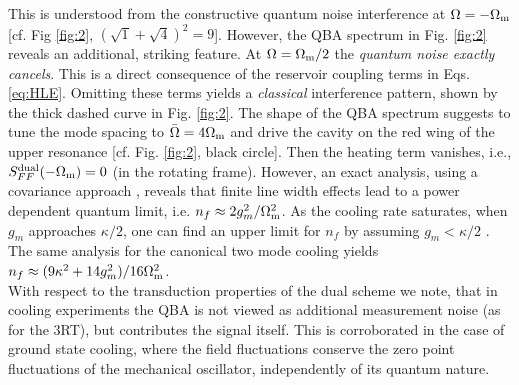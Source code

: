 \documentclass[twocolumn,english,aps,prl,superscriptaddress,showpacs,preprintnumbers]{revtex4}
\begin{document}
This is understood from the constructive quantum noise interference
at $\Omega=-\Omega_{\rm{m}}$ {[}cf. Fig \ref{fig:2}, $(\sqrt{1}+\sqrt{4})^{2}=9${]}.
However, the QBA spectrum in Fig. \ref{fig:2} reveals an additional,
striking feature. At $\Omega=\Omega_{\rm{m}}/2$ the \textit{quantum noise
exactly cancels}. This is a direct consequence of the reservoir coupling
terms in Eqs. \ref{eq:HLE}. Omitting these terms yields a \textit{classical}
interference pattern, shown by the thick dashed curve in Fig. \ref{fig:2}.
The shape of the QBA spectrum suggests to tune the mode spacing
to $\bar{\Omega}=4\Omega_{\rm{m}}$ and drive the cavity on the red wing
of the upper resonance {[}cf. Fig. \ref{fig:2}, black circle{]}.
Then the heating term vanishes, i.e., $S_{FF}^{\rm{dual}}(-\Omega_{\rm{m}})=0$
(in the rotating frame). However, an exact analysis, using a covariance
approach \cite{wilson-rae_cavity_2008}, reveals that finite line width
effects lead to a power dependent quantum limit, i.e. $n_{f}\approx2g_{m}^{2}/\Omega_{\rm{m}}^{2}$.
As the cooling rate saturates, when $g_{m}$ approaches $\kappa/2$,
one can find an upper limit for $n_{f}$ by assuming $g_{m}<\kappa/2$ \cite{Dobrindt_parametric_2008}.
The same analysis for the canonical two mode cooling yields $n_{f}\approx(9\kappa^{2}+14g_{m}^{2})/16\Omega_{\rm{m}}^{2}$.\\
With respect to the transduction properties of the dual scheme
we note, that in cooling experiments the QBA is not viewed as additional
measurement noise (as for the 3RT), but contributes the signal itself.
This is corroborated in the case of ground state cooling, where the
field fluctuations conserve the zero point fluctuations of the mechanical
oscillator, independently of its quantum nature. 
\end{document}
